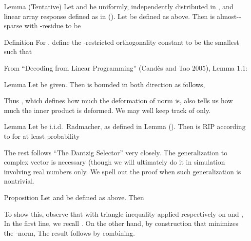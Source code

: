 \Result
{Lemma (Tentative)}
{
Let \m {\f} and \m {\th} be uniformly, independently distributed in \m {[0,2\pi)}, and linear array response  defined as in ().
Let  be defined as above.
Then  is almost--sparse with -residue  to be
%
}

\startsection [title={Design of RIP Precoders and Combiners}]

\Result
{Definition}
{
For , define the -restricted orthogonality constant  to be the smallest such that
%
}

From ``Decoding from Linear Programming'' (Cand\`es and Tao 2005), Lemma 1.1:

\Result
{Lemma}
{
Let  be given.
Then  is bounded in both direction as follows,
}

Thus , which defines how much the deformation of norm is, also tells us how much the inner product is deformed.
We may well keep track of  only.

\Result
{Lemma}
{
Let  be i.i.d.\ Radmacher, as defined in Lemma ().
Then  is RIP according to \m {\d} for at least probability
}


\color[red]{(To be done)}

\startsection [title={DS for Complex Vectors}]

The rest follows ``The Dantzig Selector'' very closely.
The generalization to complex vector is necessary (though we will ultimately do it in simulation involving real numbers only.
We spell out the proof when such generalization is nontrivial.

\Result
{Proposition}
{
Let  and  be defined as above.
Then
%
}

To show this, observe that with triangle inequality applied respectively on  and ,
In the first line, we recall .
On the other hand, by construction that  minimizes the -norm,
The result follows by combining.


